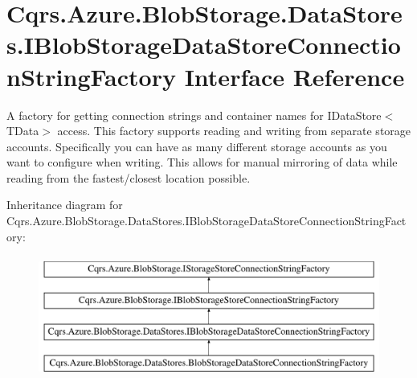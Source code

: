 \hypertarget{interfaceCqrs_1_1Azure_1_1BlobStorage_1_1DataStores_1_1IBlobStorageDataStoreConnectionStringFactory}{}\section{Cqrs.\+Azure.\+Blob\+Storage.\+Data\+Stores.\+I\+Blob\+Storage\+Data\+Store\+Connection\+String\+Factory Interface Reference}
\label{interfaceCqrs_1_1Azure_1_1BlobStorage_1_1DataStores_1_1IBlobStorageDataStoreConnectionStringFactory}


A factory for getting connection strings and container names for I\+Data\+Store$<$\+T\+Data$>$ access. This factory supports reading and writing from separate storage accounts. Specifically you can have as many different storage accounts as you want to configure when writing. This allows for manual mirroring of data while reading from the fastest/closest location possible.  


Inheritance diagram for Cqrs.\+Azure.\+Blob\+Storage.\+Data\+Stores.\+I\+Blob\+Storage\+Data\+Store\+Connection\+String\+Factory\+:\begin{figure}[H]
\begin{center}
\leavevmode
\includegraphics[height=4.000000cm]{interfaceCqrs_1_1Azure_1_1BlobStorage_1_1DataStores_1_1IBlobStorageDataStoreConnectionStringFactory}
\end{center}
\end{figure}
